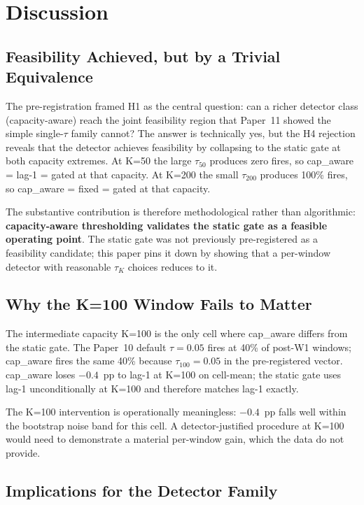 \section{Discussion}

\subsection{Feasibility Achieved, but by a Trivial Equivalence}

The pre-registration framed H1 as the central question: can a richer
detector class (capacity-aware) reach the joint feasibility region
that Paper~11 showed the simple single-$\tau$ family cannot? The
answer is technically yes, but the H4 rejection reveals that the
detector achieves feasibility by collapsing to the static gate at
both capacity extremes. At K=50 the large $\tau_{50}$ produces zero
fires, so cap\_aware = lag-1 = gated at that capacity. At K=200 the
small $\tau_{200}$ produces 100\% fires, so cap\_aware = fixed = gated
at that capacity.

The substantive contribution is therefore methodological rather
than algorithmic: \textbf{capacity-aware thresholding validates the
static gate as a feasible operating point}. The static gate was
not previously pre-registered as a feasibility candidate; this paper
pins it down by showing that a per-window detector with reasonable
$\tau_K$ choices reduces to it.

\subsection{Why the K=100 Window Fails to Matter}

The intermediate capacity K=100 is the only cell where cap\_aware
differs from the static gate. The Paper~10 default $\tau = 0.05$
fires at 40\% of post-W1 windows; cap\_aware fires the same 40\%
because $\tau_{100} = 0.05$ in the pre-registered vector. cap\_aware
loses $-0.4$~pp to lag-1 at K=100 on cell-mean; the static gate uses
lag-1 unconditionally at K=100 and therefore matches lag-1 exactly.

The K=100 intervention is operationally meaningless: $-0.4$~pp falls
well within the bootstrap noise band for this cell. A
detector-justified procedure at K=100 would need to demonstrate a
material per-window gain, which the data do not provide.

\subsection{Implications for the Detector Family}

